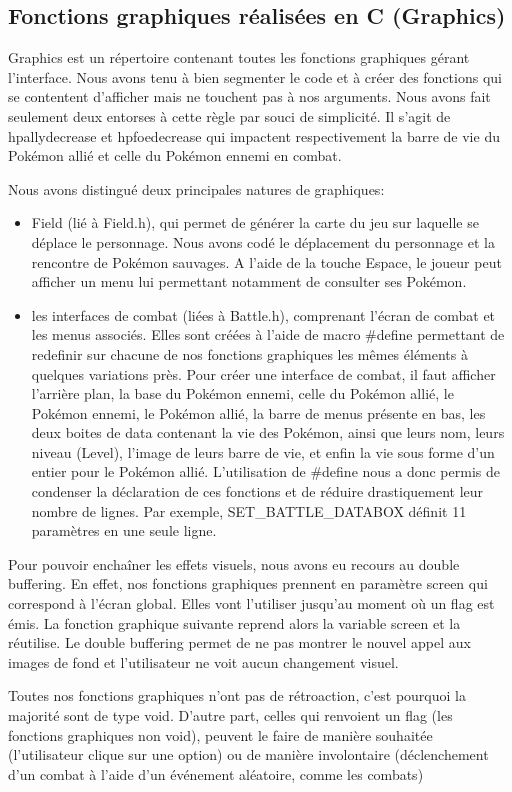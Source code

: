 \subsection{Fonctions graphiques réalisées en C (Graphics)}

Graphics est un répertoire contenant toutes les fonctions graphiques gérant l'interface. Nous avons tenu à bien segmenter le code et à créer des fonctions qui se contentent d'afficher mais ne touchent pas à nos arguments. Nous avons fait seulement deux entorses à cette règle par souci de simplicité. Il s'agit de 
 hpallydecrease et hpfoedecrease qui impactent respectivement la barre de vie du Pokémon allié et celle du Pokémon ennemi en combat.
 
Nous avons distingué deux principales natures de graphiques:

\begin{itemize}
\item Field (lié à Field.h), qui permet de générer la carte du jeu sur laquelle se déplace le personnage. Nous avons codé le déplacement du personnage et la rencontre de Pokémon sauvages. A l'aide de la touche Espace, le joueur peut afficher un menu lui permettant notamment de consulter ses Pokémon.
\item les interfaces de combat (liées à Battle.h), comprenant l'écran de combat et les menus associés. Elles sont créées à l'aide de macro \#define permettant de redefinir sur chacune de nos fonctions graphiques les mêmes éléments à quelques variations près. Pour créer une interface de combat, il faut afficher l'arrière plan, la base du Pokémon ennemi, celle du Pokémon allié, le Pokémon ennemi, le Pokémon allié, la barre de menus présente en bas, les deux boites de data contenant la vie des Pokémon, ainsi que leurs nom, leurs niveau (Level), l'image de leurs barre de vie, et enfin la vie sous forme d'un entier pour le Pokémon allié. L'utilisation de \#define nous a donc permis de condenser la déclaration de ces fonctions et de réduire drastiquement leur nombre de lignes. Par exemple, SET\_BATTLE\_DATABOX définit 11 paramètres en une seule ligne.  
\end{itemize}

Pour pouvoir enchaîner les effets visuels, nous avons eu recours au double buffering. En effet, nos fonctions graphiques prennent en paramètre screen qui correspond à l'écran global. Elles vont l'utiliser jusqu'au moment où un flag est émis. La fonction graphique suivante reprend alors la variable screen et la réutilise. Le double buffering permet de ne pas montrer le nouvel appel aux images de fond et l'utilisateur ne voit aucun changement visuel.

Toutes nos fonctions graphiques n'ont pas de rétroaction, c'est pourquoi la majorité sont de type void. D'autre part, celles qui renvoient un flag (les fonctions graphiques non void), peuvent le faire de manière souhaitée (l'utilisateur clique sur une option) ou de manière involontaire (déclenchement d'un combat à l'aide d'un événement aléatoire, comme les combats)